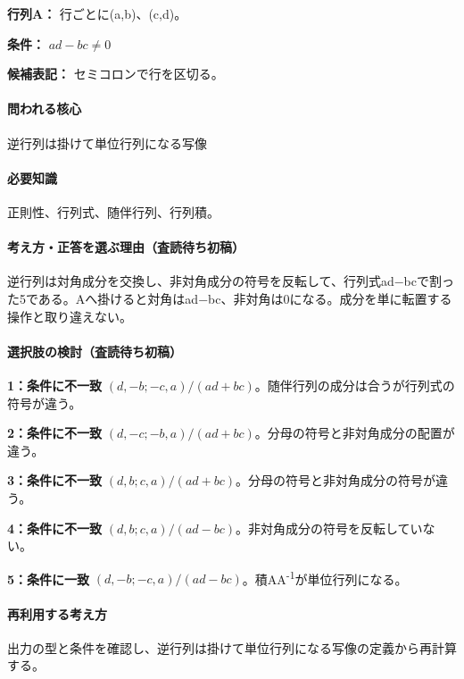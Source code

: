 \noindent\textbf{行列A：} 行ごとに(a,b)、(c,d)。\par

\noindent\textbf{条件：} \(ad-bc\neq0\)\par

\noindent\textbf{候補表記：} セミコロンで行を区切る。\par

\paragraph{問われる核心} 逆行列は掛けて単位行列になる写像

\paragraph{必要知識} 正則性、行列式、随伴行列、行列積。

\paragraph{考え方・正答を選ぶ理由（査読待ち初稿）} 逆行列は対角成分を交換し、非対角成分の符号を反転して、行列式ad−bcで割った5である。Aへ掛けると対角はad−bc、非対角は0になる。成分を単に転置する操作と取り違えない。

\paragraph{選択肢の検討（査読待ち初稿）}\mbox{}\par

\noindent\textbf{1：条件に不一致} \((d,-b;-c,a)/(ad+bc)\)。随伴行列の成分は合うが行列式の符号が違う。\par

\noindent\textbf{2：条件に不一致} \((d,-c;-b,a)/(ad+bc)\)。分母の符号と非対角成分の配置が違う。\par

\noindent\textbf{3：条件に不一致} \((d,b;c,a)/(ad+bc)\)。分母の符号と非対角成分の符号が違う。\par

\noindent\textbf{4：条件に不一致} \((d,b;c,a)/(ad-bc)\)。非対角成分の符号を反転していない。\par

\noindent\textbf{5：条件に一致} \((d,-b;-c,a)/(ad-bc)\)。積AA\textsuperscript{-1}が単位行列になる。\par

\paragraph{再利用する考え方} 出力の型と条件を確認し、逆行列は掛けて単位行列になる写像の定義から再計算する。

